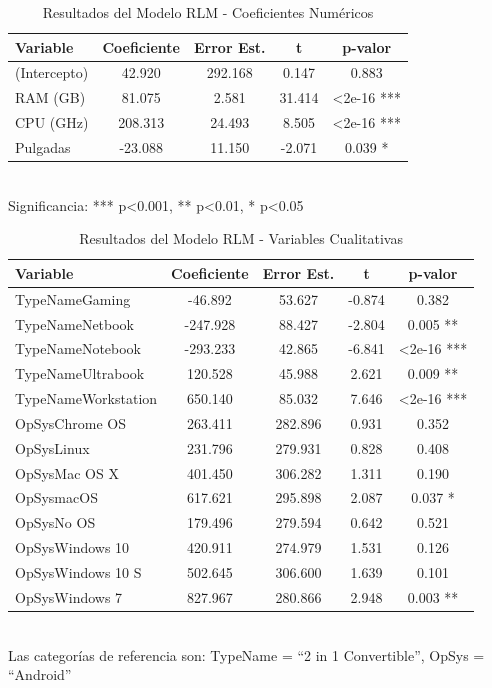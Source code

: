 \documentclass[12pt,a4paper]{article}
\begin{document}
\begin{table}[H]
\centering
\caption{Resultados del Modelo RLM - Coeficientes Numéricos}
\begin{tabular}{lcccc}
\toprule
\textbf{Variable} & \textbf{Coeficiente} & \textbf{Error Est.} & \textbf{t} & \textbf{p-valor} \\
\midrule
(Intercepto) & 42.920 & 292.168 & 0.147 & 0.883 \\
RAM (GB) & 81.075 & 2.581 & 31.414 & \textless{}2e-16 *** \\
CPU (GHz) & 208.313 & 24.493 & 8.505 & \textless{}2e-16 *** \\
Pulgadas & -23.088 & 11.150 & -2.071 & 0.039 * \\
\bottomrule
\end{tabular}
\\[0.3cm]
\small Significancia: *** p\textless{}0.001, ** p\textless{}0.01, * p\textless{}0.05
\end{table}

\begin{table}[H]
\centering
\caption{Resultados del Modelo RLM - Variables Cualitativas}
\begin{tabular}{lcccc}
\toprule
\textbf{Variable} & \textbf{Coeficiente} & \textbf{Error Est.} & \textbf{t} & \textbf{p-valor} \\
\midrule
TypeNameGaming & -46.892 & 53.627 & -0.874 & 0.382 \\
TypeNameNetbook & -247.928 & 88.427 & -2.804 & 0.005 ** \\
TypeNameNotebook & -293.233 & 42.865 & -6.841 & \textless{}2e-16 *** \\
TypeNameUltrabook & 120.528 & 45.988 & 2.621 & 0.009 ** \\
TypeNameWorkstation & 650.140 & 85.032 & 7.646 & \textless{}2e-16 *** \\
\midrule
OpSysChrome OS & 263.411 & 282.896 & 0.931 & 0.352 \\
OpSysLinux & 231.796 & 279.931 & 0.828 & 0.408 \\
OpSysMac OS X & 401.450 & 306.282 & 1.311 & 0.190 \\
OpSysmacOS & 617.621 & 295.898 & 2.087 & 0.037 * \\
OpSysNo OS & 179.496 & 279.594 & 0.642 & 0.521 \\
OpSysWindows 10 & 420.911 & 274.979 & 1.531 & 0.126 \\
OpSysWindows 10 S & 502.645 & 306.600 & 1.639 & 0.101 \\
OpSysWindows 7 & 827.967 & 280.866 & 2.948 & 0.003 ** \\
\bottomrule
\end{tabular}
\\[0.3cm]
\small Las categorías de referencia son: TypeName = ``2 in 1 Convertible'', OpSys = ``Android''
\end{table}
\end{document}
